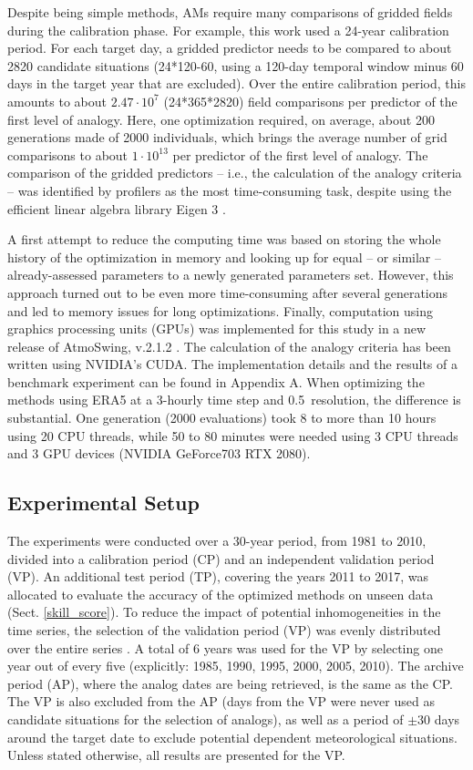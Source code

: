 \documentclass[draft]{agujournal2019}
\begin{document}
Despite being simple methods, AMs require many comparisons of gridded fields during the calibration phase. For example, this work used a 24-year calibration period. For each target day, a gridded predictor needs to be compared to about 2820 candidate situations (24*120-60, using a 120-day temporal window minus 60 days in the target year that are excluded). Over the entire calibration period, this amounts to about $2.47\cdot10^7$ (24*365*2820) field comparisons per predictor of the first level of analogy. Here, one optimization required, on average, about 200 generations made of 2000 individuals, which brings the average number of grid comparisons to about $1\cdot10^{13}$ per predictor of the first level of analogy. The comparison of the gridded predictors – i.e., the calculation of the analogy criteria -- was identified by profilers as the most time-consuming task, despite using the efficient linear algebra library Eigen 3 \cite{Guennebaud2010}.

A first attempt to reduce the computing time was based on storing the whole history of the optimization in memory and looking up for equal -- or similar -- already-assessed parameters to a newly generated parameters set. However, this approach turned out to be even more time-consuming after several generations and led to memory issues for long optimizations. Finally, computation using graphics processing units (GPUs) was implemented for this study in a new release of AtmoSwing, v.2.1.2 \cite{Horton2019b}. The calculation of the analogy criteria has been written using NVIDIA's CUDA. The implementation details and the results of a benchmark experiment can be found in Appendix A. When optimizing the methods using ERA5 at a 3-hourly time step and 0.5\degree\ resolution, the difference is substantial. One generation (2000 evaluations) took 8 to more than 10 hours using 20 CPU threads, while 50 to 80 minutes were needed using 3 CPU threads and 3 GPU devices (NVIDIA GeForce703 RTX 2080).


\subsection{Experimental Setup}
\label{setup}

The experiments were conducted over a 30-year period, from 1981 to 2010, divided into a calibration period (CP) and an independent validation period (VP). An additional test period (TP), covering the years 2011 to 2017, was allocated to evaluate the accuracy of the optimized methods on unseen data (Sect. \ref{skill_score}). To reduce the impact of potential inhomogeneities in the time series, the selection of the validation period (VP) was evenly distributed over the entire series \cite<as in>[]{BenDaoud2010}. A total of 6 years was used for the VP by selecting one year out of every five (explicitly: 1985, 1990, 1995, 2000, 2005, 2010). The archive period (AP), where the analog dates are being retrieved, is the same as the CP. The VP is also excluded from the AP (days from the VP were never used as candidate situations for the selection of analogs), as well as a period of $\pm30$ days around the target date to exclude potential dependent meteorological situations. Unless stated otherwise, all results are presented for the VP.
\end{document}
